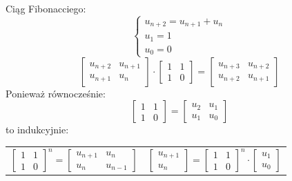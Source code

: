 \documentclass[handout]{beamer}
\theoremstyle{definition}
\theoremstyle{named}
\begin{document}
\begin{frame}{Ciąg Fibonacciego:}
\begin{equation*}
\begin{cases}
u_{n+2} = u_{n+1} + u_n \\
u_{1} = 1 \\
u_{0} = 0 
\end{cases}
\end{equation*}
\begin{equation*}
        \begin{bmatrix}
        u_{n+2} & u_{n+1} \\
        u_{n+1} & u_{n} 
        \end{bmatrix} 
        \cdot
        \begin{bmatrix}
        1 & 1\\
        1 & 0
        \end{bmatrix}
        = 
        \begin{bmatrix}
        u_{n+3} & u_{n+2}\\
        u_{n+2} & u_{n+1}
        \end{bmatrix}
\end{equation*}
Ponieważ równocześnie:
\begin{equation*}
    \begin{bmatrix}
    1 & 1 \\
    1 & 0 
    \end{bmatrix}= 
    \begin{bmatrix}
    u_2 & u_1 \\
    u_1 & u_0
    
    \end{bmatrix}
\end{equation*}
to indukcyjnie: 
\begin{table}[]
    \centering
    \begin{tabular}{c|c}
       \begin{equation*}
    
        \begin{bmatrix}
        1 & 1\\
        1 & 0
        \end{bmatrix}^n
        = 
        \begin{bmatrix}
        u_{n+1} & u_n\\
        u_{n} & u_{n-1}
        \end{bmatrix}

    \end{equation*}
&  
       \begin{equation*}
        \begin{bmatrix}
        u_{n+1} \\
        u_{n}
        \end{bmatrix}
        = 
        \begin{bmatrix}
        1 & 1\\
        1 & 0
        \end{bmatrix}^n
        \cdot
        \begin{bmatrix}
        u_1 \\
        u_0 
        \end{bmatrix}


\end{equation*}
\end{tabular}
\end{table}
\end{frame}
\end{document}
